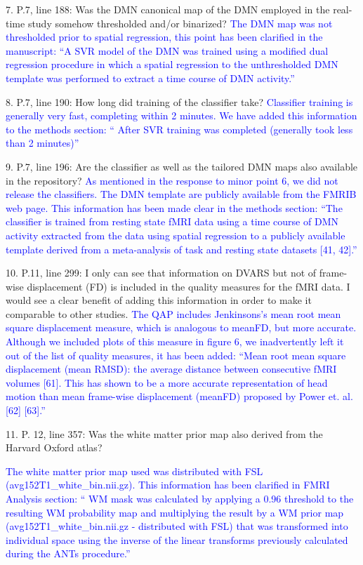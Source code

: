 \documentclass{article}
\newcommand{\RESPONSE}[1]{\textcolor{blue}{#1}}
\begin{document}
7. P.7, line 188: Was the DMN canonical map of the DMN employed in the real-time study somehow thresholded and/or binarized?
\RESPONSE{The DMN map was not thresholded prior to spatial regression, this point has been clarified in the manuscript: ``A SVR model of the DMN was trained using a modified dual regression procedure in which a spatial regression to the unthresholded DMN template was performed to extract a time course of DMN activity.''}

8. P.7, line 190: How long did training of the classifier take?
\RESPONSE{Classifier training is generally very fast, completing within 2 minutes. We have added this information to the methods section: `` After SVR training was completed (generally took less than 2 minutes)''}

9. P.7, line 196: Are the classifier as well as the tailored DMN maps also available in the repository?
\RESPONSE{As mentioned in the response to minor point 6, we did not release the classifiers. The DMN template are publicly available from the FMRIB web page. This information has been made clear in the methods section: ``The classifier is trained from resting state fMRI data using a time course of DMN activity extracted from the data using spatial regression to a publicly available template derived from a meta-analysis of task and resting state datasets [41, 42].''}

10. P.11, line 299: I only can see that information on DVARS but not of frame-wise displacement (FD) is included in the quality measures for the fMRI data. I would see a clear benefit of adding this information in order to make it comparable to other studies. \RESPONSE{The QAP includes Jenkinsons's mean root mean square displacement measure, which is analogous to meanFD, but more accurate. Although we included plots of this measure in figure 6, we inadvertently left it out of the list of quality measures, it has been added: ``Mean  root  mean  square  displacement  (mean  RMSD): the average distance between consecutive fMRI volumes  [61].   This  has  shown  to  be  a  more  accurate  representation  of  head  motion  than mean frame-wise displacement (meanFD) proposed by Power et.  al.  [62] [63].''}


11. P. 12, line 357: Was the white matter prior map also derived from the Harvard Oxford atlas?

\RESPONSE{The white matter prior map used was distributed with FSL (avg152T1\_white\_bin.nii.gz). This information has been clarified in FMRI Analysis section: `` WM mask was calculated by applying a 0.96 threshold to the resulting WM probability map and multiplying the result by a WM prior map (avg152T1\_white\_bin.nii.gz - distributed with FSL) that was transformed into individual space using the inverse of the linear transforms previously calculated during the ANTs procedure.''}
\end{document}
